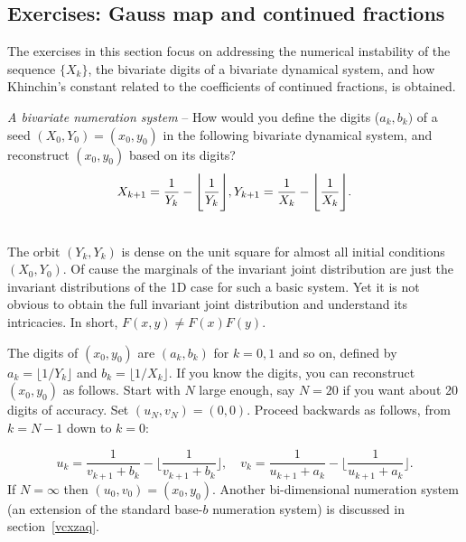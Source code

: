 \documentclass[oneside,10pt]{book}
\begin{document}
\subsection{Exercises: Gauss map and continued fractions}

The exercises in this section focus on addressing the numerical instability of the sequence $\{X_k\}$, the bivariate digits of a 
 bivariate dynamical system, and how Khinchin's constant related to the coefficients of continued fractions, is obtained. 

\begin{Exercise} {\em A bivariate numeration system} -- How would you define the digits ($a_k, b_k)$ of a seed $(X_0,Y_0)=(x_0,y_0)$ in the following bivariate dynamical system, and reconstruct $(x_0,y_0)$ based on its digits?
$$X_{k+1}=\frac{1}{Y_k}-\Bigg\lfloor\frac{1}{Y_k}\Bigg\rfloor,\\
Y_{k+1}=\frac{1}{X_k}-\Bigg\lfloor\frac{1}{X_k}\Bigg\rfloor.$$

 \\
The orbit $(Y_k,Y_k)$ is dense on the unit square for almost all initial conditions $(X_0,Y_0)$. Of cause  the marginals of the invariant joint distribution are just the invariant distributions of the 1D case for such a basic system. Yet it is not obvious to obtain the full invariant joint distribution and understand its intricacies. In short, $F(x,y)\neq F(x)F(y)$. 

The digits of $(x_0,y_0)$ are $(a_k,b_k)$ for $k=0,1$ and so on, defined by $a_k=\lfloor 1/Y_k\rfloor$ and $b_k=\lfloor 1/X_k\rfloor$. If you know the digits, you can reconstruct $(x_0,y_0)$ as follows. Start with $N$ large enough, say $N=20$ if you want about 20 digits of accuracy. Set $(u_N,v_N)=(0,0)$. Proceed backwards as follows, from $k=N-1$ down to $k=0$:

$$u_k = \frac{1}{v_{k+1}+b_k} - \Big\lfloor \frac{1}{v_{k+1}+b_k} \Big\rfloor,\quad
v_k = \frac{1}{u_{k+1}+a_k} - \Big\lfloor \frac{1}{u_{k+1}+a_k} \Big\rfloor.
$$
If $N=\infty$ then $(u_0,v_0)=(x_0,y_0)$. Another bi-dimensional numeration system (an extension of the standard base-$b$ numeration system) is discussed in section~\ref{vcxzaq}. 
\end{Exercise}
\end{document}
